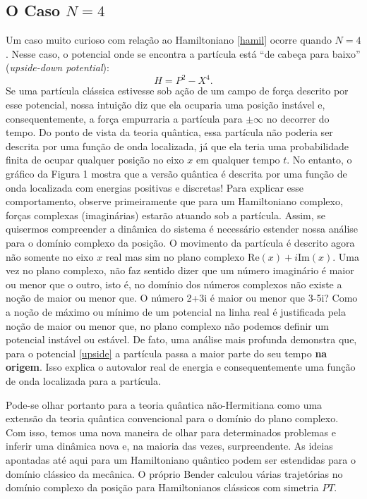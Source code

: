 \documentclass{article}
\begin{document}
\subsection{O Caso $N = 4$}

Um caso muito curioso com relação ao Hamiltoniano \eqref{hamil} ocorre quando $N = 4$. Nesse caso, o potencial onde se encontra a partícula está ``de cabeça para baixo'' (\textit{upside-down potential}):
\begin{equation}
    H = P^2 - X^4.
    \label{upside}
\end{equation}
Se uma partícula clássica estivesse sob ação de um campo de força descrito por esse potencial, nossa intuição diz que ela ocuparia uma posição instável e, consequentemente, a força empurraria a partícula para $\pm \infty$ no decorrer do tempo. Do ponto de vista da teoria quântica, essa partícula não poderia ser descrita por uma função de onda localizada, já que ela teria uma probabilidade finita de ocupar qualquer posição no eixo $x$ em qualquer tempo $t$. No entanto, o gráfico da Figura 1 mostra que a versão quântica é descrita por uma função de onda localizada com energias positivas e discretas! Para explicar esse comportamento, observe primeiramente que para um Hamiltoniano complexo, forças complexas (imaginárias) estarão atuando sob a partícula. Assim, se quisermos compreender a dinâmica do sistema é necessário estender nossa análise para o domínio complexo da posição. O movimento da partícula é descrito agora não somente no eixo $x$ real mas sim no plano complexo $\text{Re}(x) + i\text{Im}(x)$. Uma vez no plano complexo, não faz sentido dizer que um número imaginário é maior ou menor que o outro, isto é, no domínio dos números complexos não existe a noção de maior ou menor que. O número 2+3i é maior ou menor que 3-5i? Como a noção de máximo ou mínimo de um potencial na linha real é justificada pela noção de maior ou menor que, no plano complexo não podemos definir um potencial instável ou estável. De fato, uma análise mais profunda demonstra que, para o potencial \eqref{upside} a partícula passa a maior parte do seu tempo \textbf{na origem}. Isso explica o autovalor real de energia e consequentemente uma função de onda localizada para a partícula.

Pode-se olhar portanto para a teoria quântica não-Hermitiana como uma extensão da teoria quântica convencional para o domínio do plano complexo. Com isso, temos uma nova maneira de olhar para determinados problemas e inferir uma dinâmica nova e, na maioria das vezes, surpreendente. As ideias apontadas até aqui para um Hamiltoniano quântico podem ser estendidas para o domínio clássico da mecânica. O próprio Bender calculou várias trajetórias no domínio complexo da posição para Hamiltonianos clássicos com simetria $PT$.
\end{document}
